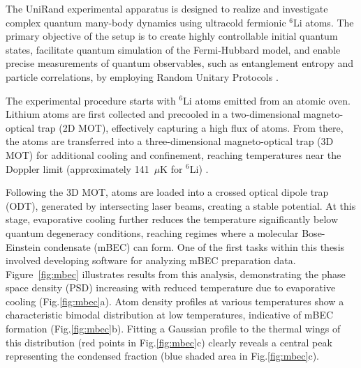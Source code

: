 







The UniRand experimental apparatus is designed to realize and investigate complex quantum many-body dynamics using ultracold fermionic $^6$Li atoms. The primary objective of the setup is to create highly controllable initial quantum states, facilitate quantum simulation of the Fermi-Hubbard model, and enable precise measurements of quantum observables, such as entanglement entropy and particle correlations, by employing Random Unitary Protocols \cite{culemann_construction_2024, huang_construction_2024}.

The experimental procedure starts with $^6$Li atoms emitted from an atomic oven. Lithium atoms are first collected and precooled in a two-dimensional magneto-optical trap (2D MOT), effectively capturing a high flux of atoms. From there, the atoms are transferred into a three-dimensional magneto-optical trap (3D MOT) for additional cooling and confinement, reaching temperatures near the Doppler limit (approximately 141~$\mu$K for $^6$Li) \cite{culemann_construction_2024, huang_construction_2024}.


Following the 3D MOT, atoms are loaded into a crossed optical dipole trap (ODT), generated by intersecting laser beams, creating a stable potential. At this stage, evaporative cooling further reduces the temperature significantly below quantum degeneracy conditions, reaching regimes where a molecular Bose-Einstein condensate (mBEC) can form. One of the first tasks within this thesis involved developing software for analyzing mBEC preparation data. Figure~\ref{fig:mbec} illustrates results from this analysis, demonstrating the phase space density (PSD) increasing with reduced temperature due to evaporative cooling (Fig.\ref{fig:mbec}a). Atom density profiles at various temperatures show a characteristic bimodal distribution at low temperatures, indicative of mBEC formation (Fig.\ref{fig:mbec}b). Fitting a Gaussian profile to the thermal wings of this distribution (red points in Fig.\ref{fig:mbec}c) clearly reveals a central peak representing the condensed fraction (blue shaded area in Fig.\ref{fig:mbec}c).

